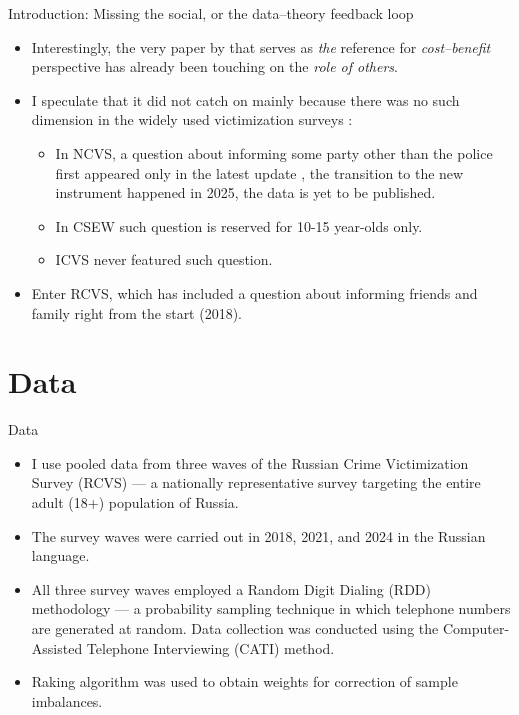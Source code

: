 \documentclass{beamer}
\newcommand\citep{
	\parencite
}
\newcommand\citet{
	\textcite
}
\begin{document}
	\begin{frame}{Introduction: Missing the social, or the data--theory feedback loop}
		\begin{itemize}
			\item Interestingly, the very paper by\citet{skogan1984reporting} that serves as \textit{the} reference for \textit{cost--benefit} perspective has already been touching on the \textit{role of others}.
			\item I speculate that it did not catch on mainly because there was no such dimension in the widely used victimization surveys\citep{xie2019crime}:
			\begin{itemize}
				\item In NCVS, a question about informing some party other than the police first appeared only in the latest update \citep{bjs@redesign}, the transition to the new instrument happened in 2025, the data is yet to be published. 
				\item In CSEW such question is reserved for 10-15 year-olds only.
				\item ICVS never featured such question.
			\end{itemize}
			\item Enter RCVS, which has included a question about informing friends and family right from the start (2018).
		\end{itemize}
	\end{frame}	

	\section{Data}
	\begin{frame}{Data}
		\begin{itemize}
			\item I use pooled data from three waves of the Russian Crime Victimization Survey (RCVS) \citep{kuchakov2026rcvs} ---  a nationally representative survey targeting the entire adult (18+) population of Russia.
			\item The survey waves were carried out in 2018, 2021, and 2024 in the Russian language. 
			\item All three survey waves employed a Random Digit Dialing (RDD) methodology --- a probability sampling technique in which telephone numbers are generated at random. Data collection was conducted using the Computer-Assisted Telephone Interviewing (CATI) method. 
			\item Raking algorithm was used to obtain weights for correction of sample imbalances.
		\end{itemize}
	\end{frame}
\end{document}
